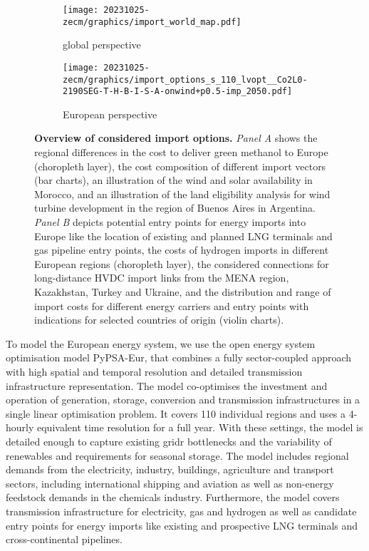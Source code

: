 \begin{figure*} 
    \begin{subfigure}[t]{\textwidth}
        \caption{global perspective}
        \label{fig:options:global}
        \texttt{[image: 20231025-zecm/graphics/import\_world\_map.pdf]}
    \end{subfigure}
    \begin{subfigure}[t]{\textwidth}
        \caption{European perspective}
        \label{fig:options:europe}
        \centering
        \texttt{[image: 20231025-zecm/graphics/import\_options\_s\_110\_lvopt\_\_Co2L0-2190SEG-T-H-B-I-S-A-onwind+p0.5-imp\_2050.pdf]}
    \end{subfigure}
    \caption{\textbf{Overview of considered import options.}
        \textit{Panel A} shows the regional differences in the cost to deliver
        green methanol to Europe (choropleth layer), the cost composition of
        different import vectors (bar charts), an illustration of the wind and
        solar availability in Morocco, and an illustration of the land
        eligibility analysis for wind turbine development in the region of
        Buenos Aires in Argentina. \textit{Panel B} depicts potential entry
        points for energy imports into Europe like the location of existing and
        planned LNG terminals and gas pipeline entry points, the costs of
        hydrogen imports in different European regions (choropleth layer), the
        considered connections for long-distance HVDC import links from the MENA
        region, Kazakhstan, Turkey and Ukraine, and the distribution and range
        of import costs for different energy carriers and entry points with
        indications for selected countries of origin (violin charts). }
    \label{fig:options}
\end{figure*}




To model the European energy system, we use the open energy system optimisation
model PyPSA-Eur,\cite{PyPSAEurSecSectorCoupled} that combines a fully
sector-coupled approach with high spatial and temporal resolution and detailed
transmission infrastructure representation. The model co-optimises the
investment and operation of generation, storage, conversion and transmission
infrastructures in a single linear optimisation problem. It covers 110
individual regions and uses a 4-hourly equivalent time resolution for a full
year. With these settings, the model is detailed enough to capture existing
gridr bottlenecks and the variability of renewables and requirements for
seasonal storage. The model includes regional demands from the electricity,
industry, buildings, agriculture and transport sectors, including international
shipping and aviation as well as non-energy feedstock demands in the chemicals
industry. Furthermore, the model covers transmission infrastructure for
electricity, gas and hydrogen as well as candidate entry points for energy
imports like existing and prospective LNG terminals and cross-continental
pipelines. 

